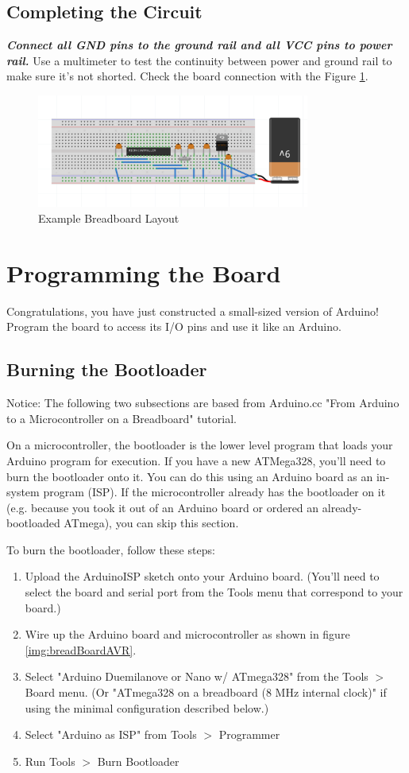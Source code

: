 \documentclass{article}
\begin{document}
\subsection{Completing the Circuit}
\textbf{\emph{Connect all GND pins to the ground rail and all VCC pins to power rail.}} Use a multimeter to test the continuity between power and ground rail to make sure it's not shorted. Check the board connection with the Figure \ref{img:egBBL}.

\begin{figure}[!h]
    \center
    \includegraphics[width=0.8\textwidth,keepaspectratio]{egBBL}
    \caption{Example Breadboard Layout}
    \label{img:egBBL}
\end{figure}

\section{Programming the Board}
Congratulations, you have just constructed a small-sized version of Arduino! Program the board to access its I/O pins and use it like an Arduino. 
\subsection{Burning the Bootloader}
Notice: The following two subsections are based from Arduino.cc "From Arduino to a Microcontroller on a Breadboard" tutorial. \par
On a microcontroller, the bootloader is the lower level program that loads your Arduino program for execution. If you have a new ATMega328, you'll need to burn the bootloader onto it. You can do this using an Arduino board as an in-system program (ISP). If the microcontroller already has the bootloader on it (e.g. because you took it out of an Arduino board or ordered an already-bootloaded ATmega), you can skip this section.

To burn the bootloader, follow these steps:
\begin{enumerate}
    \item Upload the ArduinoISP sketch onto your Arduino board. (You'll need to select the board and serial port from the Tools menu that correspond to your board.)
    \item Wire up the Arduino board and microcontroller as shown in figure \ref{img:breadBoardAVR}.
    \item Select "Arduino Duemilanove or Nano w/ ATmega328" from the Tools $>$ Board menu. (Or "ATmega328 on a breadboard (8 MHz internal clock)" if using the minimal configuration described below.)
    \item Select "Arduino as ISP" from Tools $>$ Programmer
    \item Run Tools $>$ Burn Bootloader
\end{enumerate}
\end{document}
